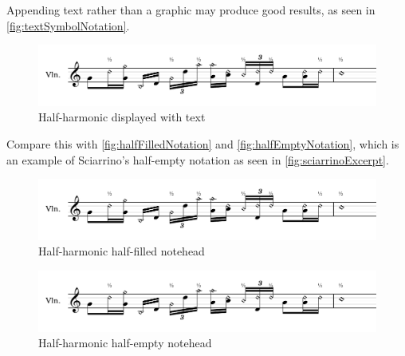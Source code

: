 Appending text rather than a graphic may produce good results, as seen in \autoref{fig:textSymbolNotation}.

\begin{figure}
  \includegraphics[page=1,width=\textwidth]{resources/halfharmonicsExampleNotation.pdf}
  \caption{Half-harmonic displayed with text} \label{fig:textSymbolNotation}
\end{figure}

Compare this with \autoref{fig:halfFilledNotation} and \autoref{fig:halfEmptyNotation}, which is an example of Sciarrino's half-empty notation as seen in \autoref{fig:sciarrinoExcerpt}.

\begin{figure}
  \includegraphics[page=5,width=\textwidth]{resources/halfharmonicsExampleNotation.pdf}
  \caption{Half-harmonic half-filled notehead} \label{fig:halfFilledNotation}
\end{figure}


\begin{figure}
  \includegraphics[page=2,width=\textwidth]{resources/halfharmonicsExampleNotation.pdf}
  \caption{Half-harmonic half-empty notehead} \label{fig:halfEmptyNotation}
\end{figure}



